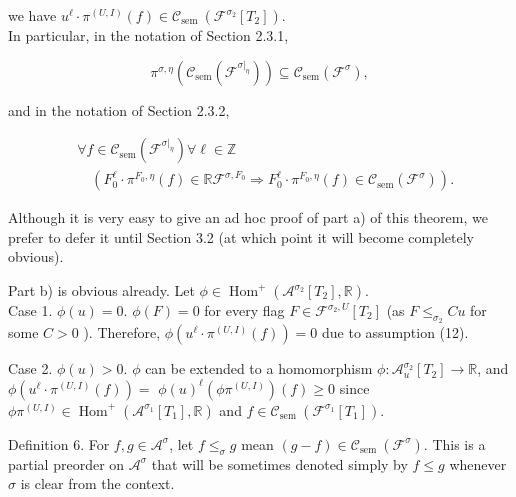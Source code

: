 \documentclass[10pt]{article}
\begin{document}
we have $u^{\ell} \cdot \pi^{(U, I)}(f) \in \mathcal{C}_{\text {sem }}\left(\mathcal{F}^{\sigma_{2}}\left[T_{2}\right]\right)$.\\
In particular, in the notation of Section 2.3.1,


\begin{equation*}
\pi^{\sigma, \eta}\left(\mathcal{C}_{\mathrm{sem}}\left(\mathcal{F}^{\left.\sigma\right|_{\eta}}\right)\right) \subseteq \mathcal{C}_{\mathrm{sem}}\left(\mathcal{F}^{\sigma}\right), \tag{13}
\end{equation*}


and in the notation of Section 2.3.2,

$$
\begin{aligned}
& \forall f \in \mathcal{C}_{\operatorname{sem}}\left(\mathcal{F}^{\left.\sigma\right|_{\eta}}\right) \forall \ell \in \mathbb{Z} \\
& \quad\left(F_{0}^{\ell} \cdot \pi^{F_{0}, \eta}(f) \in \mathbb{R} \mathcal{F}^{\sigma, F_{0}} \Longrightarrow F_{0}^{\ell} \cdot \pi^{F_{0}, \eta}(f) \in \mathcal{C}_{\operatorname{sem}}\left(\mathcal{F}^{\sigma}\right)\right) .
\end{aligned}
$$

Although it is very easy to give an ad hoc proof of part a) of this theorem, we prefer to defer it until Section 3.2 (at which point it will become completely obvious).

Part b) is obvious already. Let $\phi \in \operatorname{Hom}^{+}\left(\mathcal{A}^{\sigma_{2}}\left[T_{2}\right], \mathbb{R}\right)$.\\
Case 1. $\phi(u)=0$. $\phi(F)=0$ for every flag $F \in \mathcal{F}^{\sigma_{2}, U}\left[T_{2}\right]$ (as $F \leq_{\sigma_{2}} C u$ for some $C>0$ ). Therefore, $\phi\left(u^{\ell} \cdot \pi^{(U, I)}(f)\right)=0$ due to assumption (12).

Case 2. $\phi(u)>0$. $\phi$ can be extended to a homomorphism $\phi: \mathcal{A}_{u}^{\sigma_{2}}\left[T_{2}\right] \longrightarrow \mathbb{R}$, and $\phi\left(u^{\ell} \cdot \pi^{(U, I)}(f)\right)=$ $\phi(u)^{\ell}\left(\phi \pi^{(U, I)}\right)(f) \geq 0$ since $\phi \pi^{(U, I)} \in \operatorname{Hom}^{+}\left(\mathcal{A}^{\sigma_{1}}\left[T_{1}\right], \mathbb{R}\right)$ and $f \in \mathcal{C}_{\text {sem }}\left(\mathcal{F}^{\sigma_{1}}\left[T_{1}\right]\right)$.

Definition 6. For $f, g \in \mathcal{A}^{\sigma}$, let $f \leq_{\sigma} g$ mean $(g-f) \in \mathcal{C}_{\text {sem }}\left(\mathcal{F}^{\sigma}\right)$. This is a partial preorder on $\mathcal{A}^{\sigma}$ that will be sometimes denoted simply by $f \leq g$ whenever $\sigma$ is clear from the context.
\end{document}
